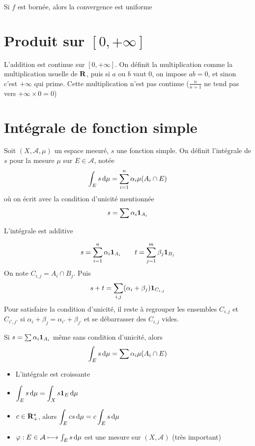 \begin{rem}
Si $f$ est bornée, alors la convergence est uniforme
\end{rem}

\section{Produit sur \texorpdfstring{$[0,+\infty]$}{[0,+inf]}}

L'addition est continue sur $[0, +\infty]$. On définit la multiplication comme la multiplication usuelle de  $\mathbf R$, puis si $a$ ou  $b$ vaut  $0$, on impose  $ab=0$, et sinon  c'est $+\infty$ qui prime. Cette multiplication n'est pas continue ($\frac{n}{n=1}$ ne tend pas vers $+\infty\times 0=0$)

\section{Intégrale de fonction simple}

\begin{dfn}
    Soit $(X, \mathcal  A, \mu)$ un espace mesuré, $s$ une fonction simple. On définit l'intégrale de  $s$ pour la mesure  $\mu$ sur  $E \in  \mathcal  A$, notée \[
        \int_E s\mathop{}\!\mathrm d \mu=\sum_{i=1}^n \alpha_i \mu(A_i\cap E)
    \] 
    où  on écrit avec la condition d'unicité mentionnée \[
        s=\sum \alpha_i \bm{1}_{A_i}
    \] 
\end{dfn}

\begin{prop}
L'intégrale est additive
\end{prop}

\begin{prop}
\[
    s=\sum_{i=1}^n \alpha_i \bm{1}_{A_i} \qquad  t=\sum_{j=1}^m \beta_j \bm{1}_{B_j}
\] 
On note $C_{i,j}=A_i\cap B_j$. Puis \[
    s+t=\sum_{i, j} (\alpha_i+\beta_j)\bm{1}_{C_{i,j}}
\] 
Pour satisfaire la condition d'unicité, il reste à regrouper les ensembles $C_{i,j}$ et $C_{i',j'}$ si $\alpha_i+\beta_j=\alpha_{i'}+\beta_{j'}$ et se débarrasser des $C_{i,j}$ vides.
\end{prop}

\begin{cor}
    Si $s=\sum \alpha_i\bm{1}_{A_i}$ même sans condition d'unicité, alors \[
        \int_E s\mathop{}\!\mathrm d \mu=\sum \alpha_i\mu(A_i\cap E)
    \] 
\end{cor}

\begin{prop}
\begin{itemize}
    \item L'intégrale est croissante
    \item $\displaystyle \int_E s\mathop{}\!\mathrm d \mu=\int_X s\bm{1}_E\mathop{}\!\mathrm d \mu$ 
    \item $c \in  \mathbf R_+^\star$, alors $\displaystyle \int_E cs\mathop{}\!\mathrm d \mu=c\int_Es\mathop{}\!\mathrm d \mu$
    \item  $\varphi:E \in  \mathcal  A \longmapsto \int_E s\mathop{}\!\mathrm d \mu$ est une mesure sur $(X, \mathcal  A)$ (très important)
\end{itemize}
\end{prop}

